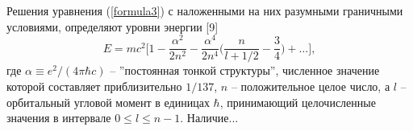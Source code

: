 \documentclass[a5paper,8pt]{article}
\begin{document}
Решения уравнения (\ref{formula3}) с наложенными на них разумными граничными условиями, определяют уровни энергии [9]
\begin{equation}
E = mc^2\biggl[1-\frac{\alpha^2}{2n^2}-\frac{\alpha^4}{2n^4}\biggl(\frac{n}{l+1/2}-\frac{3}{4}\biggl)+\ldots \biggr],
\end{equation}
где $\alpha\equiv e^2/(4\pi\hbar c)$ -- ''постоянная тонкой структуры'', численное значение которой составляет приблизительно $1/137$, $n$ -- положительное целое число, а $l$ -- орбитальный угловой момент в единицах $\hbar$, принимающий целочисленные значения в интервале $0\le l\le n-1$. Наличие...
\end{document}
